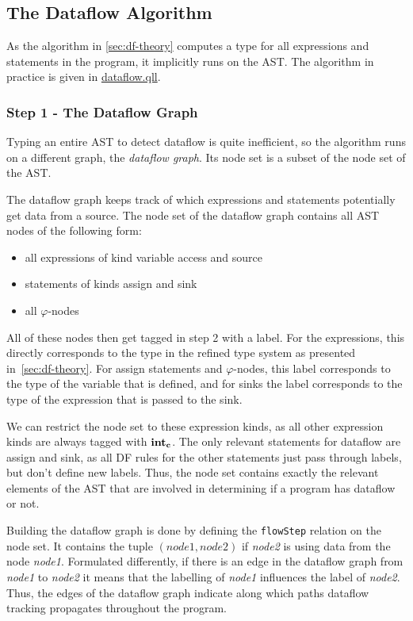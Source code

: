 \subsection{The Dataflow Algorithm}
As the algorithm in \autoref{sec:df-theory} computes a type for all expressions and statements in the program,
it implicitly runs on the AST.
The algorithm in practice is given in \hyperref[lst:dataflow]{dataflow.qll}.

\subsubsection*{Step 1 - The Dataflow Graph}
Typing an entire AST to detect dataflow is quite inefficient, so the algorithm
runs on a different graph, the \emph{dataflow graph}.
Its node set is a subset of the node set of the AST.

The dataflow graph keeps track of which expressions and statements potentially get data from a source.
The node set of the dataflow graph contains all AST nodes of the following form:
\begin{itemize}
    \item all expressions of kind variable access and source
    \item statements of kinds assign and sink
    \item all $\varphi$-nodes
\end{itemize}

All of these nodes then get tagged in step 2 with a label.
For the expressions, this directly corresponds to the type in the refined type system
as presented in~\autoref{sec:df-theory}.
For assign statements and $\varphi$-nodes, this label corresponds to the type of 
the variable that is defined, and for sinks the label corresponds to the type
of the expression that is passed to the sink.

We can restrict the node set to these expression kinds, as all other expression kinds
are always tagged with $\textbf{int}_\textbf{c}$.
The only relevant statements for dataflow are assign and sink, as all DF rules for the 
other statements just pass through labels, but don't define new labels.
Thus, the node set contains  exactly the relevant elements of the AST that are involved in determining
if a program has dataflow or not.

Building the dataflow graph is done by defining the \texttt{flowStep} relation on the node set.
It contains the tuple $(\textit{node1}, \textit{node2})$ if \textit{node2} is using
data from the node \textit{node1}.
Formulated differently, if there is an edge in the dataflow graph from \textit{node1}
to \textit{node2} it means that the labelling of \textit{node1} influences
the label of \textit{node2}.
Thus, the edges of the dataflow graph indicate along which paths dataflow tracking propagates
throughout the program.

